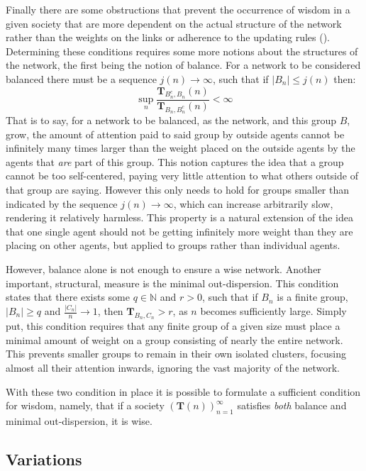 \documentclass{article}
\newcommand{\T}{\textbf{T}}
\newcommand{\Soc}{(\T(n))^{\infty}_{n=1}}
\begin{document}
Finally there are some obstructions that prevent the occurrence of wisdom in a given society that are more dependent on the actual structure of the network rather than the weights on the links or adherence to the updating rules (\cite{jackson2010social}). Determining these conditions requires some more notions about the structures of the network, the first being the notion of balance. For a network to be considered balanced there must be a sequence $j(n) \to \infty$, such that if $|B_n| \leq j(n)$ then:
\begin{equation}
    \sup_n \frac{\T_{B^c_n, B_n}(n)}{\T_{B_n, B^c_n}(n)} < \infty
\end{equation}
That is to say, for a network to be balanced, as the network, and this group $B$, grow, the amount of attention paid to said group by outside agents cannot be infinitely many times larger than the weight placed on the outside agents by the agents that \emph{are} part of this group.
This notion captures the idea that a group cannot be too self-centered, paying very little attention to what others outside of that group are saying. However this only needs to hold for groups smaller than indicated by the sequence $j(n) \to\infty$, which can increase arbitrarily slow, rendering it relatively harmless.
This property is a natural extension of the idea that one single agent should not be getting infinitely more weight than they are placing on other agents, but applied to groups rather than individual agents. \newline

However, balance alone is not enough to ensure a wise network. Another important, structural, measure is the minimal out-dispersion. This condition states that there exists some $q\in \mathbb{N}$ and $r > 0$, such that if $B_n$ is a finite group, $|B_n|\geq q$ and $\frac{|C_n|}{n}\to 1$, then $\textbf{T}_{B_n, C_n} > r$, as $n$ becomes sufficiently large. Simply put, this condition requires that any finite group of a given size must place a minimal amount of weight on a group consisting of nearly the entire network. This prevents smaller groups to remain in their own isolated clusters, focusing almost all their attention inwards, ignoring the vast majority of the network.

With these two condition in place it is possible to formulate a sufficient condition for wisdom, namely, that if a society $\Soc$ satisfies \emph{both} balance and minimal out-dispersion, it is wise.

\subsection{Variations}
\end{document}
